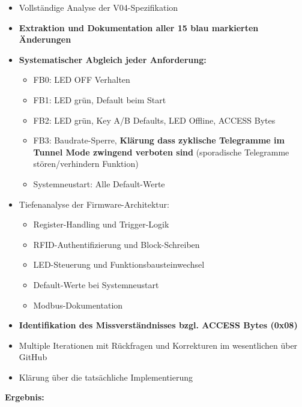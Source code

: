 \documentclass[a4paper,11pt]{article}
\providecommand{\tightlist}{\setlength{\itemsep}{0pt}\setlength{\parskip}{0pt}}
\begin{document}
\begin{itemize}
\tightlist
\item
  Vollständige Analyse der V04-Spezifikation
\item
  \textbf{Extraktion und Dokumentation aller 15 blau markierten
  Änderungen}
\item
  \textbf{Systematischer Abgleich jeder Anforderung:}

  \begin{itemize}
  \tightlist
  \item
    FB0: LED OFF Verhalten
  \item
    FB1: LED grün, Default beim Start
  \item
    FB2: LED grün, Key A/B Defaults, LED Offline, ACCESS Bytes
  \item
    FB3: Baudrate-Sperre, \textbf{Klärung dass zyklische Telegramme im
    Tunnel Mode zwingend verboten sind} (sporadische Telegramme
    stören/verhindern Funktion)
  \item
    Systemneustart: Alle Default-Werte
  \end{itemize}
\item
  Tiefenanalyse der Firmware-Architektur:

  \begin{itemize}
  \tightlist
  \item
    Register-Handling und Trigger-Logik
  \item
    RFID-Authentifizierung und Block-Schreiben
  \item
    LED-Steuerung und Funktionsbausteinwechsel
  \item
    Default-Werte bei Systemneustart
  \item
    Modbus-Dokumentation
  \end{itemize}
\item
  \textbf{Identifikation des Missverständnisses bzgl. ACCESS Bytes
  (0x08)}
\item
  Multiple Iterationen mit Rückfragen und Korrekturen im wesentlichen
  über GitHub
\item
  Klärung über die tatsächliche Implementierung
\end{itemize}

\textbf{Ergebnis:}
\end{document}
